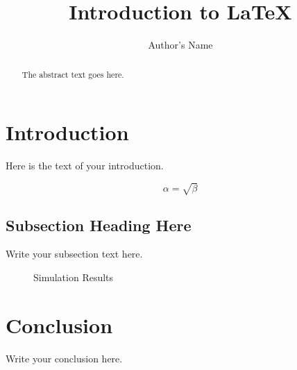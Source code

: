 \documentclass{article}
\begin{document}
\title{Introduction to \LaTeX{}}
\author{Author's Name}

\maketitle

\begin{abstract}
The abstract text goes here.
\end{abstract}

\section{Introduction}
Here is the text of your introduction.

\begin{equation}
    \label{simple_equation}
        \alpha = \sqrt{ \beta }
	\end{equation}

	\subsection{Subsection Heading Here}
	Write your subsection text here.

	\begin{figure}
	    \centering
		    \caption{Simulation Results}
		        \label{simulationfigure}
			\end{figure}

			\section{Conclusion}
			Write your conclusion here.

			
\end{document}
